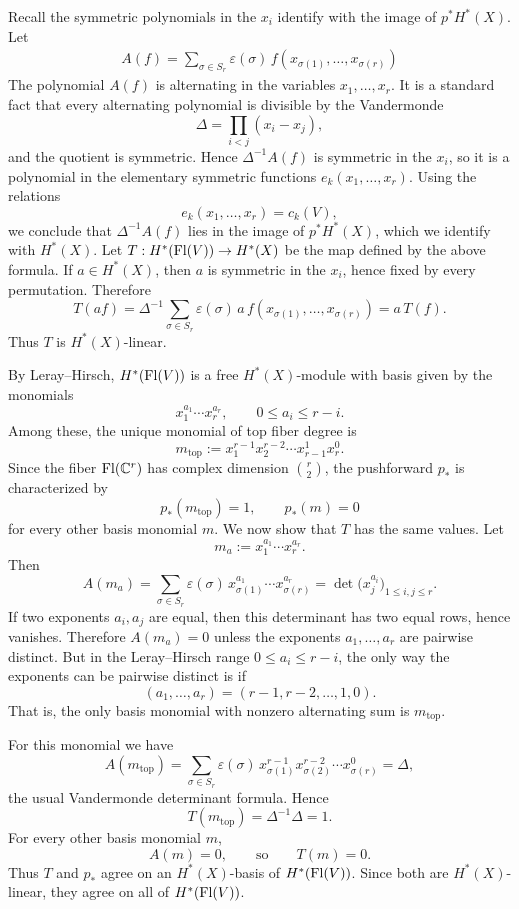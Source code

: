 \documentclass[12pt]{article}  %
\begin{document}
\begin{solution}
Recall the symmetric polynomials in the \(x_i\) identify with the image of \(p^*H^*(X)\). Let \begin{align*}
    A(f) = \sum_{\sigma\in S_r}\varepsilon(\sigma)\,f(x_{\sigma(1)},\dots,x_{\sigma(r)})
\end{align*}
The polynomial \(A(f)\) is alternating in the variables \(x_1,\dots,x_r\). It is a standard fact that every alternating polynomial is divisible by the Vandermonde
\[
\Delta=\prod_{i<j}(x_i-x_j),
\]
and the quotient is symmetric. Hence \(\Delta^{-1}A(f)\) is symmetric in the \(x_i\), so it is a polynomial in the elementary symmetric functions \(e_k(x_1,\dots,x_r)\). Using the relations
\[
e_k(x_1,\dots,x_r)=c_k(V),
\]
we conclude that \(\Delta^{-1}A(f)\) lies in the image of \(p^*H^*(X)\), which we identify with \(H^*(X)\). Let $T:H^*(\operatorname{Fl}(V))\to H^*(X)$ be the map defined by the above formula. If \(a\in H^*(X)\), then \(a\) is symmetric in the \(x_i\), hence fixed by every permutation. Therefore
\[
T(af)
=
\Delta^{-1}\sum_{\sigma\in S_r}\varepsilon(\sigma)\,
a\,f(x_{\sigma(1)},\dots,x_{\sigma(r)})
=
a\,T(f).
\]
Thus \(T\) is \(H^*(X)\)-linear.

By Leray--Hirsch, \(H^*(\operatorname{Fl}(V))\) is a free \(H^*(X)\)-module with basis given by the monomials
\[
x_1^{a_1}\cdots x_r^{a_r},
\qquad
0\le a_i\le r-i.
\]
Among these, the unique monomial of top fiber degree is
\[
m_{\mathrm{top}}:=x_1^{r-1}x_2^{r-2}\cdots x_{r-1}^1x_r^0.
\]
Since the fiber \(\operatorname{Fl}(\mathbb{C}^r)\) has complex dimension \(\binom r2\), the pushforward \(p_*\) is characterized by
\[
p_*(m_{\mathrm{top}})=1,
\qquad
p_*(m)=0
\]
for every other basis monomial \(m\). We now show that \(T\) has the same values. Let
\[
m_a:=x_1^{a_1}\cdots x_r^{a_r}.
\]
Then
\[
A(m_a)
=
\sum_{\sigma\in S_r}\varepsilon(\sigma)\,
x_{\sigma(1)}^{a_1}\cdots x_{\sigma(r)}^{a_r}
=
\det\!\bigl(x_j^{a_i}\bigr)_{1\le i,j\le r}.
\]
If two exponents \(a_i,a_j\) are equal, then this determinant has two equal rows, hence vanishes. Therefore \(A(m_a)=0\) unless the exponents \(a_1,\dots,a_r\) are pairwise distinct. But in the Leray--Hirsch range \(0\le a_i\le r-i\), the only way the exponents can be pairwise distinct is if
\[
(a_1,\dots,a_r)=(r-1,r-2,\dots,1,0).
\]
That is, the only basis monomial with nonzero alternating sum is \(m_{\mathrm{top}}\).

For this monomial we have
\[
A(m_{\mathrm{top}})
=
\sum_{\sigma\in S_r}\varepsilon(\sigma)\,
x_{\sigma(1)}^{r-1}x_{\sigma(2)}^{r-2}\cdots x_{\sigma(r)}^0
=
\Delta,
\]
the usual Vandermonde determinant formula. Hence
\[
T(m_{\mathrm{top}})=\Delta^{-1}\Delta=1.
\]
For every other basis monomial \(m\),
\[
A(m)=0,
\qquad\text{so}\qquad
T(m)=0.
\]
Thus \(T\) and \(p_*\) agree on an \(H^*(X)\)-basis of \(H^*(\operatorname{Fl}(V))\). Since both are \(H^*(X)\)-linear, they agree on all of \(H^*(\operatorname{Fl}(V))\).
\end{solution}
\end{document}
